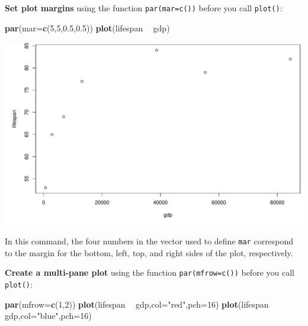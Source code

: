 \documentclass[
]{book}
\newenvironment{Shaded}{\begin{snugshade}}{\end{snugshade}}
\newcommand{\DataTypeTok}[1]{\textcolor[rgb]{0.13,0.29,0.53}{#1}}
\newcommand{\DecValTok}[1]{\textcolor[rgb]{0.00,0.00,0.81}{#1}}
\newcommand{\FloatTok}[1]{\textcolor[rgb]{0.00,0.00,0.81}{#1}}
\newcommand{\KeywordTok}[1]{\textcolor[rgb]{0.13,0.29,0.53}{\textbf{#1}}}
\newcommand{\NormalTok}[1]{#1}
\newcommand{\OperatorTok}[1]{\textcolor[rgb]{0.81,0.36,0.00}{\textbf{#1}}}
\newcommand{\StringTok}[1]{\textcolor[rgb]{0.31,0.60,0.02}{#1}}
\begin{document}
\textbf{Set plot margins} using the function \texttt{par(mar=c())} before you call \texttt{plot()}:

\begin{Shaded}
\begin{Highlighting}[]
\KeywordTok{par}\NormalTok{(}\DataTypeTok{mar=}\KeywordTok{c}\NormalTok{(}\DecValTok{5}\NormalTok{,}\DecValTok{5}\NormalTok{,}\FloatTok{0.5}\NormalTok{,}\FloatTok{0.5}\NormalTok{))}
\KeywordTok{plot}\NormalTok{(lifespan }\OperatorTok{~}\StringTok{ }\NormalTok{gdp)}
\end{Highlighting}
\end{Shaded}

\includegraphics{figures/unnamed-chunk-112-1.pdf}

In this command, the four numbers in the vector used to define \texttt{mar} correspond to the margin for the bottom, left, top, and right sides of the plot, respectively.

\textbf{Create a multi-pane plot} using the function \texttt{par(mfrow=c())} before you call \texttt{plot()}:

\begin{Shaded}
\begin{Highlighting}[]
\KeywordTok{par}\NormalTok{(}\DataTypeTok{mfrow=}\KeywordTok{c}\NormalTok{(}\DecValTok{1}\NormalTok{,}\DecValTok{2}\NormalTok{))}
\KeywordTok{plot}\NormalTok{(lifespan }\OperatorTok{~}\StringTok{ }\NormalTok{gdp,}\DataTypeTok{col=}\StringTok{"red"}\NormalTok{,}\DataTypeTok{pch=}\DecValTok{16}\NormalTok{)}
\KeywordTok{plot}\NormalTok{(lifespan }\OperatorTok{~}\StringTok{ }\NormalTok{gdp,}\DataTypeTok{col=}\StringTok{"blue"}\NormalTok{,}\DataTypeTok{pch=}\DecValTok{16}\NormalTok{)}
\end{Highlighting}
\end{Shaded}
\end{document}
